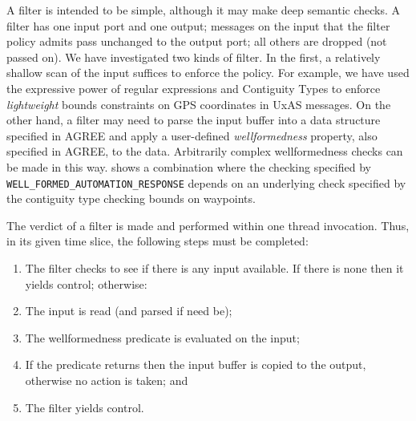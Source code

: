 A filter is intended to be simple, although it may make deep semantic
checks. A filter has one input port and one output; messages on the
input that the filter policy admits pass unchanged to the output port;
all others are dropped (not passed on). We have investigated two kinds
of filter. In the first, a relatively shallow scan of the input
suffices to enforce the policy. For example, we have used the
expressive power of regular expressions and Contiguity
Types \cite{contiguity-types} to enforce \emph{lightweight} bounds
constraints on GPS coordinates in UxAS messages. On the other hand, a
filter may need to parse the input buffer into a data structure
specified in AGREE and apply a user-defined \emph{wellformedness}
property, also specified in AGREE, to the data. Arbitrarily complex
wellformedness checks can be made in this
way.  shows a combination where the checking
specified by {\small\verb+WELL_FORMED_AUTOMATION_RESPONSE+} depends on
an underlying check specified by the contiguity type checking bounds
on waypoints.

The verdict of a filter is made and performed within one thread
invocation. Thus, in its given time slice, the following steps must be
completed:

\begin{enumerate}

\item The filter checks to see if there is any input available.  If there is none
then it yields control; otherwise:

\item The input is read (and parsed if need be);

\item The wellformedness predicate is evaluated on the input;

\item If the predicate returns  then the input buffer
 is copied to the output, otherwise no action is taken; and

\item The filter yields control.
\end{enumerate}

